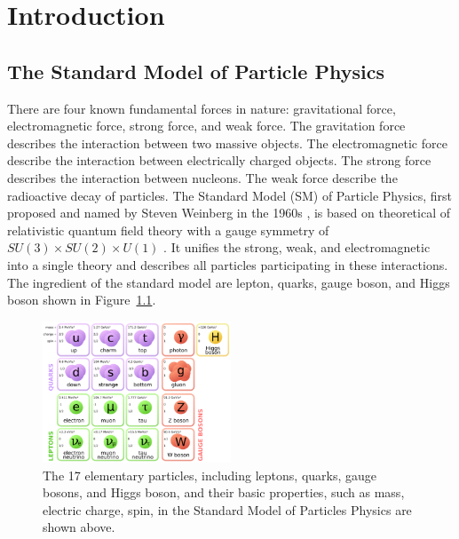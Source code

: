 
\chapter{Introduction}

\section{The Standard Model of Particle Physics}


There are four known fundamental forces in nature: gravitational force, electromagnetic force, strong force, and weak force. The gravitation force describes the interaction between two massive objects. The electromagnetic force describe the interaction between electrically charged objects. The strong force describes the interaction between nucleons. The weak force describe the radioactive decay of particles. The Standard Model (SM) of Particle Physics, first proposed and named by Steven Weinberg in the 1960s \cite{StandardModel}, is based on theoretical of relativistic quantum field theory with a gauge symmetry of $SU(3) \times SU(2) \times U(1)$ \cite{SMTheory}. It unifies the strong, weak, and electromagnetic into a single theory and describes all particles participating in these interactions. The ingredient of the standard model are lepton, quarks, gauge boson, and Higgs boson shown in Figure~\ref{fig:SMParticle}.

\begin{figure}[hbtp]
\begin{center}
\includegraphics[width=0.50\textwidth]{Figures/Chapter1/SMParticles.png}
\caption{The 17 elementary particles, including leptons, quarks, gauge bosons, and Higgs boson, and their basic properties, such as mass, electric charge, spin, in the Standard Model of Particles Physics are shown above.}
\label{fig:SMParticle}
\end{center}
\end{figure} 


